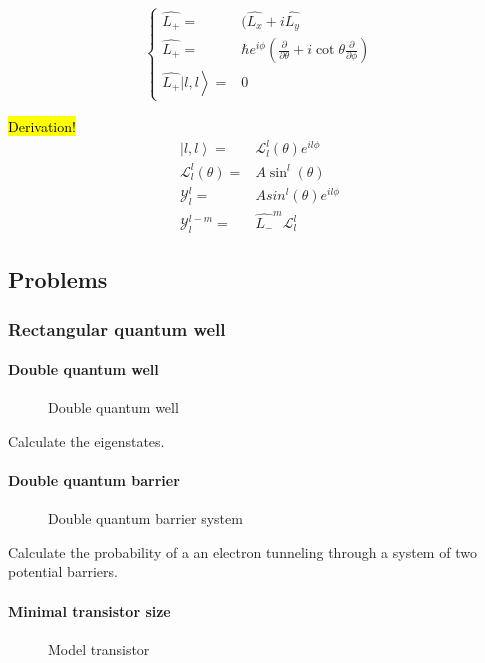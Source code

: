 		\begin{align}
			\left\{ \begin{aligned}
				\hat{L_+} =& (\hat{L_x} +i\hat{L_y}\\
				\hat{L_+} =& \hbar e^{i\phi}\left(\frac{\partial}{\partial \theta} + i\cot{\theta}\frac{\partial}{\partial \phi}\right) \\
				\left. \hat{L_+}|l,l\right\rangle =& 0
			\end{aligned} \right.
		\end{align}
		
		\hl{Derivation!}
		\begin{align}
			\left|l,l\right\rangle =& \mathcal{L}_l^l (\theta) e^{il\phi} \\
			\mathcal{L}_l^l (\theta) =& A\sin^l (\theta) \\
			\mathcal{Y}_l^l =& Asin^l(\theta)e^{il\phi}\\
			\mathcal{Y}_l^{l-m} =& \hat{L_-}^m\mathcal{L}_l^l
		\end{align}
		
	\newpage
	\subsection{Problems}
		\subsubsection{Rectangular quantum well}
			\paragraph{Double quantum well}
				\begin{figure}[!h]
					\centering
					
					\caption{Double quantum well}
				\end{figure}
				
				Calculate the eigenstates.
			\paragraph{Double quantum barrier}
				\begin{figure}[!h]
					\centering
					
					\caption{Double quantum barrier system}
				\end{figure}
				
				Calculate the probability of a an electron tunneling through a system of two potential barriers.			
			\paragraph{Minimal transistor size}
				\begin{figure}[!h]
					\centering
					
					\caption{Model transistor}
				\end{figure}
							
